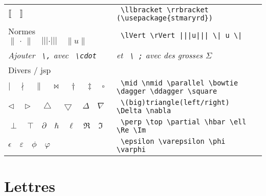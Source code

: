 \documentclass{report}
\begin{document}
\begin{tabular}{ll}
$\llbracket \quad \rrbracket$
&
\texttt{
\textbackslash{}llbracket \textbackslash{}rrbracket (\textbackslash{}usepackage\{stmaryrd\})
}
\\

Normes $ \lVert \, \cdot \, \rVert \quad |||\cdot||| \quad \| u \|$
&
\texttt{
\textbackslash{}lVert \textbackslash{}rVert \quad |||u||| \quad \textbackslash{}| u \textbackslash{}|
}
\\

\textit{ Ajouter \texttt{ \textbackslash{},} avec \texttt{ \textbackslash{}cdot } }
&
\textit{ et \texttt{ \textbackslash{}\!\! ;} avec des grosses $ \Sigma $ }
\\

Divers / jsp
&
\\

$ \mid \quad \nmid \quad \parallel \quad \bowtie \quad \dagger \quad \ddagger \quad \square	$
&
\texttt{
\textbackslash{}mid \textbackslash{}nmid \textbackslash{}parallel \textbackslash{}bowtie \textbackslash{}dagger \textbackslash{}ddagger \textbackslash{}square
}
\\

$ \triangleleft \quad \triangleright \quad \bigtriangleup \quad \bigtriangledown \quad \Delta \quad \nabla	$
&
\texttt{
\textbackslash{}(big)triangle(left/right) \textbackslash{}Delta \textbackslash{}nabla
}
\\

$ \perp \quad \top \quad \partial \quad \hbar \quad \ell \quad \Re \quad \Im $
&
\texttt{
\textbackslash{}perp \textbackslash{}top \textbackslash{}partial \textbackslash{}hbar \textbackslash{}ell \textbackslash{}Re \textbackslash{}Im
}
\\

$ \epsilon \quad \varepsilon \quad \phi \quad \varphi $
&
\texttt{
\textbackslash{}epsilon \textbackslash{}varepsilon \textbackslash{}phi \textbackslash{}varphi
}
\\


\end{tabular}	

\restoregeometry

\newpage


\section*{Lettres}  %
\end{document}

